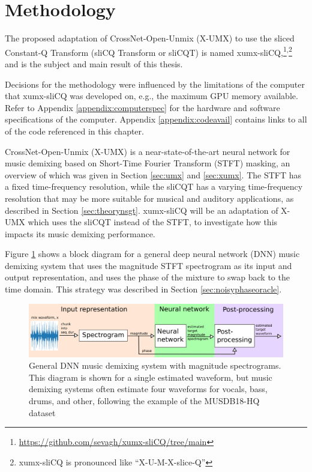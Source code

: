\documentclass[report.tex]{subfiles}
\begin{document}
\section{Methodology}
\label{ch:methodology}

The proposed adaptation of CrossNet-Open-Unmix (X-UMX) to use the sliced Constant-Q Transform (sliCQ Transform or sliCQT) is named xumx-sliCQ,\footnote{\url{https://github.com/sevagh/xumx-sliCQ/tree/main}}\textsuperscript{,}\footnote{xumx-sliCQ is pronounced like ``X-U-M-X-slice-Q''} and is the subject and main result of this thesis.

Decisions for the methodology were influenced by the limitations of the computer that xumx-sliCQ was developed on, e.g., the maximum GPU memory available. Refer to Appendix \ref{appendix:computerspec} for the hardware and software specifications of the computer. Appendix \ref{appendix:codeavail} contains links to all of the code referenced in this chapter.

CrossNet-Open-Unmix (X-UMX) is a near-state-of-the-art neural network for music demixing based on Short-Time Fourier Transform (STFT) masking, an overview of which was given in Section \ref{sec:umx} and \ref{sec:xumx}. The STFT has a fixed time-frequency resolution, while the sliCQT has a varying time-frequency resolution that may be more suitable for musical and auditory applications, as described in Section \ref{sec:theorynsgt}. xumx-sliCQ will be an adaptation of X-UMX which uses the sliCQT instead of the STFT, to investigate how this impacts its music demixing performance.

Figure \ref{fig:generalmdx} shows a block diagram for a general deep neural network (DNN) music demixing system that uses the magnitude STFT spectrogram as its input and output representation, and uses the phase of the mixture to swap back to the time domain. This strategy was described in Section \ref{sec:noisyphaseoracle}.

\begin{figure}[ht]
	\centering
	\includegraphics[width=\textwidth]{./images-blockdiagrams/generic_mdx.png}
	\caption{General DNN music demixing system with magnitude spectrograms. This diagram is shown for a single estimated waveform, but music demixing systems often estimate four waveforms for vocals, bass, drums, and other, following the example of the MUSDB18-HQ dataset}
	\label{fig:generalmdx}
\end{figure}
\end{document}
